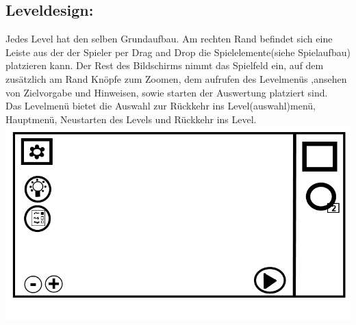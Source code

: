 \documentclass{scrartcl}
\begin{document}
\begin{enumerate}
	\begin{minipage}{1\textwidth}
		\item \subsection*{Leveldesign:} \label{appaufbau:Leveldesign}
		Jedes Level hat den selben Grundaufbau. Am rechten Rand befindet sich eine Leiste aus der der Spieler per Drag and Drop die Spielelemente(siehe Spielaufbau) platzieren kann. Der Rest des Bildschirms nimmt das Spielfeld ein, auf dem zusätzlich am Rand Knöpfe zum Zoomen, dem aufrufen des Levelmenüs ,ansehen von Zielvorgabe und Hinweisen, sowie starten der Auswertung platziert sind.\\
		Das Levelmenü bietet die Auswahl zur Rückkehr ins Level(auswahl)menü, Hauptmenü, Neustarten des Levels und Rückkehr ins Level.\\
		\includegraphics[width=\textwidth, height=7.5cm]{assets/LevelDesign}
	\end{minipage}
	

\end{enumerate}
\end{document}
